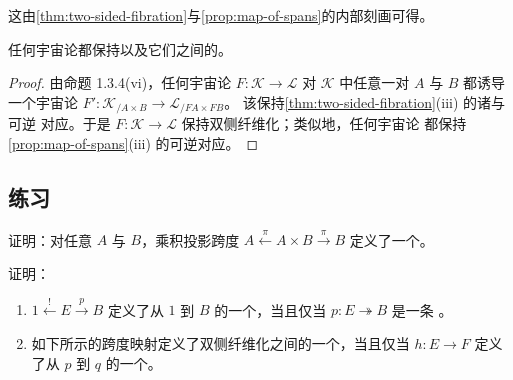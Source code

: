 这由\cref{thm:two-sided-fibration}与\cref{prop:map-of-spans}的内部刻画可得。

\begin{corollary}\label{cor:cosmological-preserves-two-sided}
任何宇宙论\trFunctor{}都保持\trTwoSidedFibration{}以及它们之间的\trCartesianFunctor{}。
\end{corollary}

\begin{proof}
由命题 1.3.4(vi)，任何宇宙论\trFunctor{} $F\colon\mathcal{K}\to\mathcal{L}$
对 $\mathcal{K}$ 中任意一对\trInfinityCategory{} $A$ 与 $B$ 都诱导一个宇宙论%
\trFunctor{} $F'\colon\mathcal{K}_{/A\times B}\to\mathcal{L}_{/FA\times FB}$。
该\trFunctor{}保持\cref{thm:two-sided-fibration}(iii) 的诸\trFiberedAdjunction{}与可逆
对应。于是
$F\colon\mathcal{K}\to\mathcal{L}$ 保持双侧纤维化；类似地，任何宇宙论%
\trFunctor{}都保持\cref{prop:map-of-spans}(iii) 的可逆对应。
\end{proof}


\subsection*{练习}

\begin{exercise}\label{ex:product-projection-span}
证明：对任意\trInfinityCategory{} $A$ 与 $B$，乘积投影跨度
$A\xleftarrow{\pi}A\times B\xrightarrow{\pi}B$ 定义了一个\trTwoSidedFibration{}。
\end{exercise}

\begin{exercise}\label{ex:two-sided-from-terminal}
证明：
\begin{enumerate}[label=(\roman*)]
\item \trTwoSidedIsofibration $1\xleftarrow{!}E\xrightarrow{p}B$ 定义了从 $1$ 到 $B$
的一个\trTwoSidedFibration{}，当且仅当 $p\colon E\twoheadrightarrow B$ 是一条%
\trCartesianFibration{}。
\item 如下所示的跨度映射定义了双侧纤维化之间的一个\trCartesianFunctor{}，当且仅当
$h\colon E\to F$ 定义了从 $p$ 到 $q$ 的一个\trCartesianFunctor{}。
\end{enumerate}
\begin{center}
\end{center}
\end{exercise}

